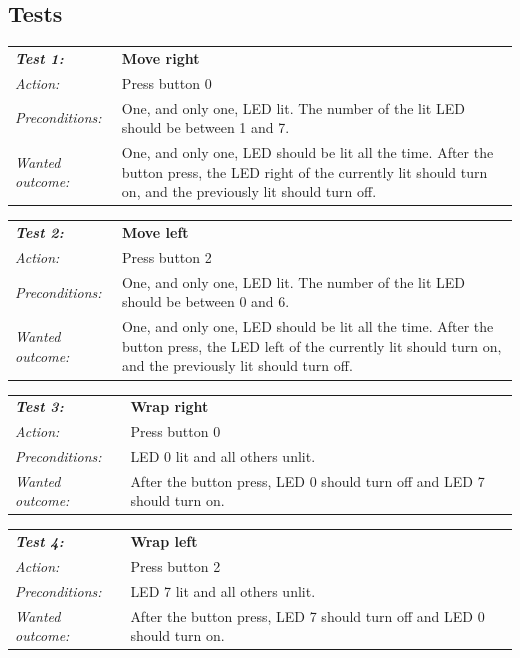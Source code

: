 \subsection{Tests}

\begin{tabular}[h]{|lp{12cm}|} \hline
\textbf{\emph{Test 1:}}  	& \textbf{Move right}\\
\emph{Action:} 		& Press button 0\\
\emph{Preconditions:}	& One, and only one, LED lit. The number of the lit LED should be between 1 and 7.\\
\emph{Wanted outcome:}	& One, and only one, LED should be lit all the time. After the button press, the LED right of the currently lit should turn on, and the previously lit should turn off.\\ \hline
\end{tabular}

\vspace{1cm}

\begin{tabular}[h]{|lp{12cm}|} \hline
\textbf{\emph{Test 2:}} 		& \textbf{Move left}\\
\emph{Action:} 		& Press button 2\\
\emph{Preconditions:}	& One, and only one, LED lit. The number of the lit LED should be between 0 and 6.\\
\emph{Wanted outcome:}	& One, and only one, LED should be lit all the time. After the button press, the LED left of the currently lit should turn on, and the previously lit should turn off. \\ \hline
\end{tabular}

\vspace{1cm}

\begin{tabular}[h]{|lp{12cm}|} \hline
\textbf{\emph{Test 3:}} 		& \textbf{Wrap right}\\
\emph{Action:} 		& Press button 0\\
\emph{Preconditions:}	& LED 0 lit and all others unlit.\\
\emph{Wanted outcome:}	& After the button press, LED 0 should turn off and LED 7 should turn on.\\ \hline
\end{tabular}

\vspace{1cm}

\begin{tabular}[h]{|lp{12cm}|} \hline
\textbf{\emph{Test 4:}} 		& \textbf{Wrap left}\\
\emph{Action:} 		& Press button 2\\
\emph{Preconditions:}	& LED 7 lit and all others unlit.\\
\emph{Wanted outcome:}	& After the button press, LED 7 should turn off and LED 0 should turn on.\\ \hline
\end{tabular}

